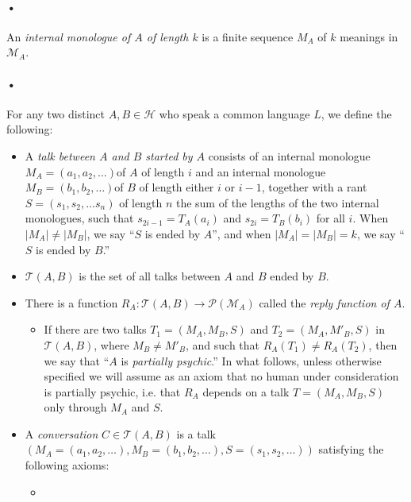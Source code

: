 \documentclass[12pt]{article}
\begin{document}
\paragraph*{•}
An \textit{internal monologue of $A$ of length $k$} is a finite sequence $M_A$ of $k$ meanings in $\mathcal{M}_A$.
\paragraph*{•}
For any two distinct $A,B\in\mathcal{H}$ who speak a common language $L$, we define the following:
\begin{itemize}
\item A \textit{talk between $A$ and $B$ started by $A$} consists of an internal monologue $M_A=\left(a_1,a_2,\ldots\right)$of $A$ of length $i$ and an internal monologue  $M_B=\left(b_1,b_2,\ldots\right)$of $B$ of length either $i$ or $i-1$, together with a rant $S=\left( s_1,s_2,\ldots s_n\right)$ of length $n$ the sum of the lengths of the two internal monologues, such that $s_{2i-1}=T_A(a_i)$ and $s_{2i}=T_B(b_i)$ for all $i$.  When $|M_A|\neq |M_B|$, we say ``$S$ is ended by $A$'', and when $|M_A|=|M_B|=k$, we say ``$S$ is ended by $B$.''

\item $\mathcal{T}(A,B)$ is the set of all talks between $A$ and $B$ ended by $B$.

\item There is a function $R_A:\mathcal{T}(A,B)\rightarrow \mathcal{P}(\mathcal{M}_A)$ called the \textit{reply function of $A$}.
\begin{itemize}
\item If there are two talks $T_1=(M_A,M_B,S)$ and $T_2=(M_A,M'_B,S)$ in $\mathcal{T}(A,B)$, where $M_B\neq M'_B$, and such that $R_A(T_1)\neq R_A(T_2)$, then we say that ``$A$ is \textit{partially psychic}.''  In what follows, unless otherwise specified we will assume as an axiom that no human under consideration is partially psychic, i.e. that $R_A$ depends on a talk $T=(M_A,M_B,S)$ only through $M_A$ and $S$.
\end{itemize}

\item A \textit{conversation} $C\in\mathcal{T}(A,B)$ is a talk $(M_A=(a_1,a_2,\ldots),M_B=(b_1,b_2,\ldots),S=(s_1,s_2,\ldots))$ satisfying the following axioms:
\begin{itemize}
\item
\end{itemize}
\end{itemize}
\end{document}
